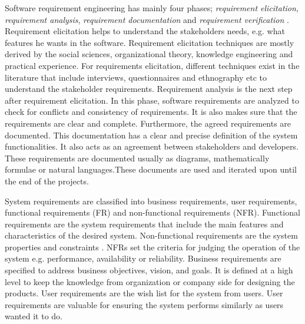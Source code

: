 	Software requirement engineering has mainly four phases; \emph{requirement
elicitation}, \emph{requirement analysis}, \emph{requirement documentation} and
\emph{requirement verification} \cite {Kotonya:1998}. Requirement elicitation
\cite{Coughlan:2002, Zowghi2005} helps to understand the
stakeholders needs, e.g. what features he wants in the software.
Requirement elicitation techniques are mostly derived by the social sciences,
organizational theory, knowledge engineering and practical experience. For
requirements elicitation, different techniques exist in the literature that
include interviews, questionnaires and ethnography etc to understand the
stakeholder requirements.
Requirement analysis \cite{Nuseibeh:2000} is the next step
after requirement elicitation. In this phase, software requirements are analyzed
to check for conflicts and consistency of requirements. It is also makes sure
that the requirements are clear and complete.
Furthermore, the agreed requirements are documented. This documentation has a clear and precise
definition of the system functionalities. It also acts as an agreement between
stakeholders and developers. These requirements are documented usually as diagrams, mathematically
formulae or natural languages.These documents are used and iterated upon until the end of the projects.

	System requirements are classified into business requirements, user
requirements, functional requirements (FR) and non-functional requirements (NFR). Functional
requirements are the system requirements that include the main features and
characteristics of the desired system. Non-functional requirements are the
system properties and constraints \cite{Davis:1993, Glinz}. NFRs set the
criteria for judging the operation of the system e.g.
performance, availability or reliability. Business requirements are specified to
address business objectives, vision, and goals. It is defined at a high level to
keep the knowledge from organization or company side for designing the products.
User requirements are the wish list for the system from users.
User requirements are valuable for ensuring the system performs similarly as users wanted it to do.
